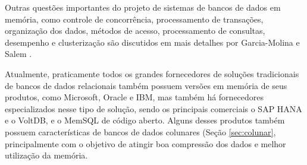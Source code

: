 Outras questões importantes do projeto de sistemas de bancos de dados em memória, como controle de concorrência, processamento de transações, organização dos dados, métodos de acesso, processamento de consultas, desempenho e clusterização são discutidos em mais detalhes por Garcia-Molina e Salem \citep{garcia1992main}.

Atualmente, praticamente todos os grandes fornecedores de soluções tradicionais de bancos de dados 
relacionais também possuem versões em memória de seus produtos, como Microsoft, Oracle e IBM, mas 
também há fornecedores especializados nesse tipo de solução, sendo os principais comerciais o SAP HANA
e o VoltDB, e o MemSQL de código aberto. Alguns desses produtos também possuem 
características de bancos de dados colunares (Seção \ref{sec:colunar}, principalmente com o objetivo 
de atingir boa compressão dos dados e melhor utilização da memória.





